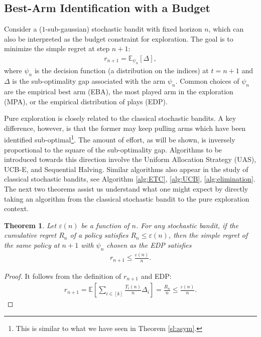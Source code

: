 \documentclass[letterpaper,11pt,openright,openany]{book}
\numberwithin{equation}{section}
\theoremstyle{plain}
\newtheorem{Th}{Theorem}[section]
\theoremstyle{definition}
\def\E{{\mathbb E}}
\def\e{{\varepsilon}}
\begin{document}
\subsection{Best-Arm Identification with a Budget}

Consider a ($1$-sub-gaussian) stochastic bandit with fixed horizon $n$, which can also be interpreted as the budget constraint for exploration.  The goal is to minimize the simple regret at step $n+1$:
\begin{align*}
r_{n+1} = \E_{\psi_n}[\Delta],
\end{align*}
where $\psi_n$ is the decision function (a distribution on the indices) at $t=n+1$ and $\Delta$ is the sub-optimality gap associated with the arm $\psi_n$. Common choices of $\psi_n$ are the empirical best arm (EBA), the most played arm in the exploration (MPA), or the empirical distribution of plays (EDP). 

Pure exploration is closely related to the classical stochastic bandits. A key difference, however, is that the former may keep pulling arms which have been identified sub-optimal\footnote{This is similar to what we have seen in Theorem \ref{sl:asym}.}. The amount of effort, as will be shown, is inversely proportional to the square of the sub-optimality gap. Algorithms to be introduced towards this direction involve the Uniform Allocation Strategy (UAS),  UCB-E, and Sequential Halving. Similar algorithms also appear in the study of classical stochastic bandits, see Algorithm \ref{alg:ETC}, \ref{alg:UCB}, \ref{alg:elimination}. The next two theorems assist us understand what one might expect by directly taking an algorithm from the classical stochastic bandit to the pure exploration context. 


\begin{Th}
Let $\e(n)$ be a function of $n$. For any stochastic bandit, if the cumulative regret $R_n$ of a policy satisfies $R_n\leq\e(n)$, then the simple regret of the same policy at $n+1$ with $\psi_n$ chosen as the EDP satisfies \begin{align*}
r_{n+1}\leq \frac{\e(n)}{n}.
\end{align*}  
\end{Th}
\begin{proof}
It follows from the definition of $r_{n+1}$ and EDP:
\begin{align*}
r_{n+1}=\E\left[\sum_{i\in [k]}\frac{T_i(n)}{n}\Delta_i\right]=\frac{R_n}{n}\leq\frac{\e (n)}{n}. 
\end{align*}
\end{proof}
\end{document}
